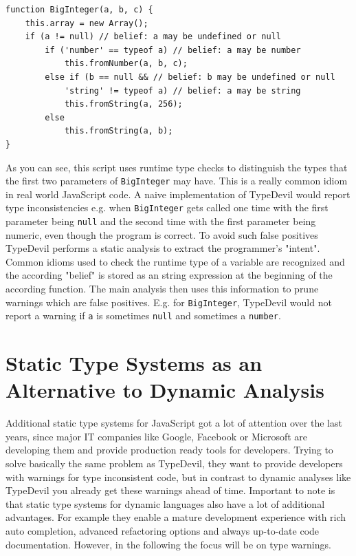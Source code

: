 \documentclass[runningheads,a4paper]{llncs}
\begin{document}
\medskip\medskip
\lstset{language=javascript}
\begin{minipage}{\linewidth}
\begin{lstlisting}[frame=single, caption=Pruning via Belief Analysis, label={lst:BeliefAnalysis}]
function BigInteger(a, b, c) { 
    this.array = new Array();
    if (a != null) // belief: a may be undefined or null
        if ('number' == typeof a) // belief: a may be number
            this.fromNumber(a, b, c);
        else if (b == null && // belief: b may be undefined or null
            'string' != typeof a) // belief: a may be string
            this.fromString(a, 256); 
        else  
            this.fromString(a, b);
}
\end{lstlisting}
\end{minipage}

As you can see, this script uses runtime type checks to distinguish the types that the first two parameters of \lstinline[columns=fixed]{BigInteger} may have.
This is a really common idiom in real world JavaScript code.
A naive implementation of TypeDevil would report type inconsistencies e.g. when \lstinline[columns=fixed]{BigInteger} gets called one time with the first parameter being \lstinline[columns=fixed]{null} and the second time with the first parameter being numeric, even though the program is correct. 
To avoid such false positives TypeDevil performs a static analysis to extract the programmer’s "intent".
Common idioms used to check the runtime type of a variable are recognized and the according "belief" is stored as an string expression at the beginning of the according function.
The main analysis then uses this information to prune warnings which are false positives.
E.g. for \lstinline[columns=fixed]{BigInteger}, TypeDevil would not report a warning if \lstinline[columns=fixed]{a} is sometimes \lstinline[columns=fixed]{null} and sometimes a \lstinline[columns=fixed]{number}.

\section{Static Type Systems as an Alternative to Dynamic Analysis}

Additional static type systems for JavaScript got a lot of attention over the last years, since major IT companies like Google, Facebook or Microsoft are developing them and provide production ready tools for developers.
Trying to solve basically the same problem as TypeDevil, they want to provide developers with warnings for type inconsistent code, but in contrast to dynamic analyses like TypeDevil you already get these warnings ahead of time.
Important to note is that static type systems for dynamic languages also have a lot of additional advantages.
For example they enable a mature development experience with rich auto completion, advanced refactoring options and always up-to-date code documentation.
However, in the following the focus will be on type warnings.
\end{document}
